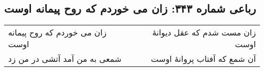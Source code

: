 \begin{center}
\section*{رباعی شماره ۳۴۳: زان می خوردم که روح پیمانه اوست}
\label{sec:0343}
\begin{longtable}{l p{0.5cm} r}
زان می خوردم که روح پیمانه اوست
&&
زان مست شدم که عقل دیوانهٔ اوست
\\
شمعی به من آمد آتشی در من زد
&&
آن شمع که آفتاب پروانهٔ اوست
\\
\end{longtable}
\end{center}
